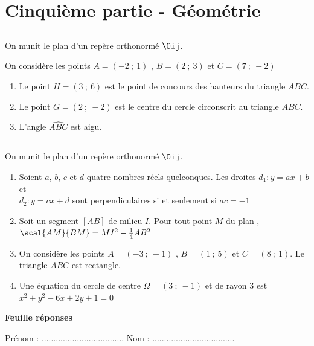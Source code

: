 \documentclass[oneside,12pt]{article}
\begin{document}
\section*{Cinquième partie - Géométrie}

\subsection{}
On munit le plan d'un repère orthonormé $\Oij$.

On considère les points $A=(-2~;~1)$ , $B=(2~;~3)$ et $C=(7~;~-2)$
\begin{enumerate}
	\item Le point $H=(3~;~6)$ est le point de concours des hauteurs du triangle $ABC$.
	\item Le point $G=(2~;~-2)$ est le centre du cercle circonscrit au triangle $ABC$.
	\item L'angle $\widehat{ABC}$ est aigu.
\end{enumerate}



\subsection{}
On munit le plan d'un repère orthonormé $\Oij$.
\begin{enumerate}
	\item Soient $a$, $b$, $c$ et $d$ quatre nombres réels quelconques. Les droites $d_1:y=ax+b$ et\\ $d_2:y=cx+d$ sont perpendiculaires si et seulement si $ac=-1$
	\item Soit un segment $[AB]$ de milieu $I$. Pour tout point $M$ du plan , $\scal{AM}{BM}=MI^2-\frac{1}{4}AB^2$
	\item On considère les points $A=(-3~;~-1)$ , $B=(1~;~5)$ et $C=(8~;~1)$. Le triangle $ABC$ est rectangle.
	\item Une équation du cercle de centre $\Omega=(3~;~-1)$ et de rayon $3$ est $x^2+y^2-6x+2y+1=0$
\end{enumerate}





\newpage
\thispagestyle{empty}



\begin{center}
    \textbf{Feuille réponses}
\end{center}

Prénom : ................................... \hspace{7.9cm} Nom : ...................................
\bigskip
\end{document}
